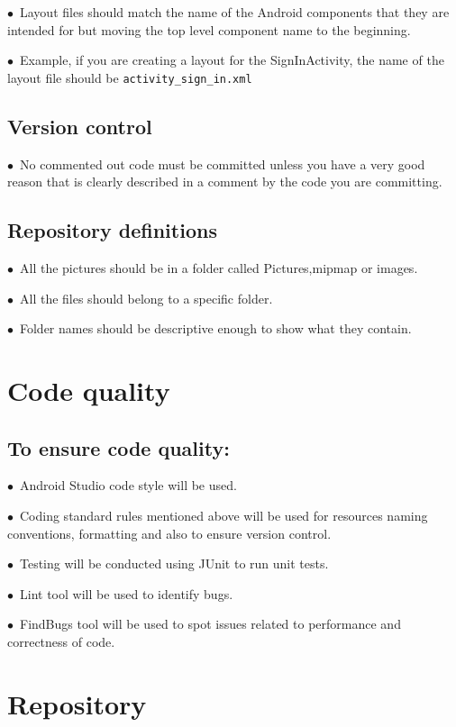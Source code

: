\documentclass[english]{article}
\begin{document}
$\bullet$\ Layout files should match the name of the Android components that they are intended for but moving the top level component name to the beginning. \par
$\bullet$\ Example, if you are creating a layout for the SignInActivity, the name of the layout file should be \texttt{activity\_sign\_in.xml} \par


\subsection{Version control}
$\bullet$\ No commented out code must be committed unless you have a very good reason that is clearly described in a comment by the code you are committing. \par


\subsection{Repository definitions}
$\bullet$\ All the pictures should be in a folder called Pictures,mipmap or images. \par
$\bullet$\ All the files should belong to a specific folder. \par
$\bullet$\ Folder names should be descriptive enough to show what they contain. \par

\section{Code quality}
\subsection{To ensure code quality:}
$\bullet$\ Android Studio code style will be used. \par
$\bullet$\ Coding standard rules mentioned above will be used for resources naming conventions, formatting and also to ensure version control.
 \par
$\bullet$\ Testing will be conducted using JUnit to run unit tests. \par
$\bullet$\ Lint tool will be used to identify bugs. \par
$\bullet$\ FindBugs tool will be used to spot issues related to performance and correctness of code. \par

\section{Repository}
\end{document}
